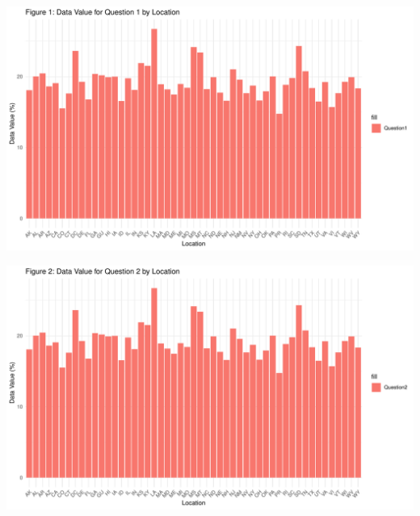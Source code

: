 \documentclass[
]{article}
\begin{document}
\includegraphics{FinalPM566---Rmarkdown_files/figure-latex/unnamed-chunk-18-1.pdf}

\includegraphics{FinalPM566---Rmarkdown_files/figure-latex/unnamed-chunk-19-1.pdf}
\end{document}
